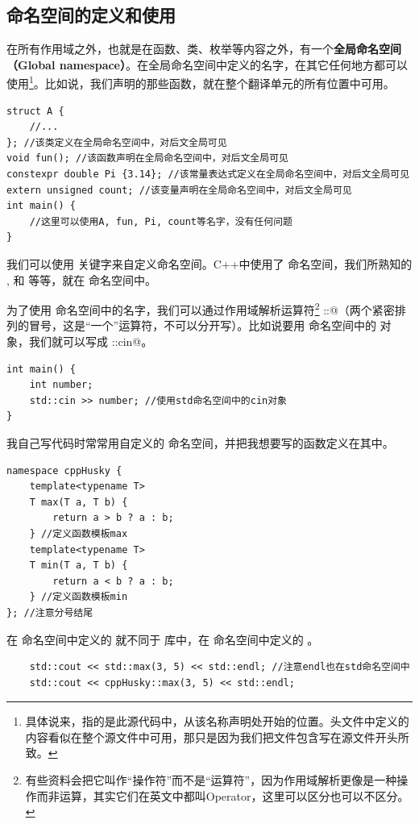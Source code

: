 \subsection*{命名空间的定义和使用}
在所有作用域之外，也就是在函数、类、枚举等内容之外，有一个\textbf{全局命名空间（Global namespace）}。在全局命名空间中定义的名字，在其它任何地方都可以使用\footnote{具体说来，指的是此源代码中，从该名称声明处开始的位置。头文件中定义的内容看似在整个源文件中可用，那只是因为我们把文件包含写在源文件开头所致。}。比如说，我们声明的那些函数，就在整个翻译单元的所有位置中可用。\par
\begin{lstlisting}
struct A {
    //...
}; //该类定义在全局命名空间中，对后文全局可见
void fun(); //该函数声明在全局命名空间中，对后文全局可见
constexpr double Pi {3.14}; //该常量表达式定义在全局命名空间中，对后文全局可见
extern unsigned count; //该变量声明在全局命名空间中，对后文全局可见
int main() {
    //这里可以使用A, fun, Pi, count等名字，没有任何问题
}
\end{lstlisting}\par
我们可以使用 \lstinline@namespace@ 关键字来自定义命名空间。C++中使用了 \lstinline@std@ 命名空间，我们所熟知的 \lstinline@cin@, \lstinline@cout@ 和 \lstinline@endl@ 等等，就在 \lstinline@std@ 命名空间中。\par
为了使用 \lstinline@std@ 命名空间中的名字，我们可以通过作用域解析运算符\footnote{有些资料会把它叫作``操作符''而不是``运算符''，因为作用域解析更像是一种操作而非运算，其实它们在英文中都叫Operator，这里可以区分也可以不区分。} \lstinline@::@（两个紧密排列的冒号，这是``一个''运算符，不可以分开写）。比如说要用 \lstinline@std@ 命名空间中的 \lstinline@cin@ 对象，我们就可以写成 \lstinline@std::cin@。
\begin{lstlisting}
int main() {
    int number;
    std::cin >> number; //使用std命名空间中的cin对象
}
\end{lstlisting}\par
我自己写代码时常常用自定义的 \lstinline@cppHusky@ 命名空间，并把我想要写的函数定义在其中。
\begin{lstlisting}
namespace cppHusky {
    template<typename T>
    T max(T a, T b) {
        return a > b ? a : b;
    } //定义函数模板max
    template<typename T>
    T min(T a, T b) {
        return a < b ? a : b;
    } //定义函数模板min
}; //注意分号结尾
\end{lstlisting}
在 \lstinline@cppHusky@ 命名空间中定义的 \lstinline@max@ 就不同于 \lstinline@algorithm@ 库中，在 \lstinline@std@ 命名空间中定义的 \lstinline@max@。
\begin{lstlisting}
    std::cout << std::max(3, 5) << std::endl; //注意endl也在std命名空间中
    std::cout << cppHusky::max(3, 5) << std::endl;
\end{lstlisting}
